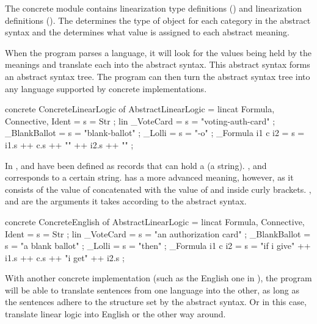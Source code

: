 The concrete module contains linearization type definitions () and linearization definitions
(). The  determines the type of object for each category in the abstract syntax and the  determines what value is assigned to each abstract meaning. 

When the program parses a language, it will look for the values being held by the meanings and translate each into the abstract syntax. This abstract syntax forms an abstract syntax tree. The program can then turn the abstract syntax tree into any language supported by concrete implementations.

\begin{lstgf}
concrete ConcreteLinearLogic of AbstractLinearLogic = {
    lincat 
        Formula, Connective, Ident = {s = Str} ;
    lin 
        _VoteCard = {s = "voting-auth-card"} ;
        _BlankBallot = {s = "blank-ballot"} ;
        _Lolli = {s = "-o"} ;
        _Formula i1 c i2 = {s = i1.s ++ c.s ++ "{" ++ i2.s ++ "}"} ;
}
\end{lstgf}

In  ,  and  have been defined as records that can hold a  (a string). ,  and  corresponds to a certain string. 
 has a more advanced meaning, however, as it consists of the value of  concatenated with the value of  and  inside curly brackets. ,  and  are the arguments it takes according to the abstract syntax.

\begin{lstgf}
concrete ConcreteEnglish of AbstractLinearLogic = {
    lincat 
        Formula, Connective, Ident = {s = Str} ;
    lin 
        _VoteCard = {s = "an authorization card"} ;
        _BlankBallot = {s = "a blank ballot"} ;
        _Lolli = {s = "then"} ;
        _Formula i1 c i2 = {s = "if i give" ++ i1.s ++ c.s ++ "i get" ++ i2.s} ;
}
\end{lstgf}

With another concrete implementation (such as the English one in ), the program will be able to translate sentences from one language into the other, as long as the sentences adhere to the structure set by the abstract syntax. Or in this case, translate linear logic into English or the other way around.

